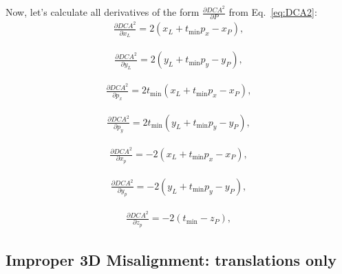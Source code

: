 \documentclass[a4paper,11pt]{article}
\begin{document}
Now, let's calculate all derivatives of the form $\frac{\partial DCA^2}{\partial P}$ from Eq.~\ref{eq:DCA2}:
\begin{equation}
\begin{split}
\frac{\partial DCA^2}{\partial x_L}  = 2 \left(x_L+t_{\min } p_x-x_P\right),
\end{split}
\end{equation}

\begin{equation}
\begin{split}
\frac{\partial DCA^2}{\partial y_L}  = 2 \left(y_L+t_{\min } p_y-y_P\right),
\end{split}
\end{equation}

\begin{equation}
\begin{split}
\frac{\partial DCA^2}{\partial p_x}  = 2 t_{\min } \left(x_L+t_{\min } p_x-x_P\right),
\end{split}
\end{equation}

\begin{equation}
\begin{split}
\frac{\partial DCA^2}{\partial p_y}  = 2 t_{\min } \left(y_L+t_{\min } p_y-y_P\right),
\end{split}
\end{equation}


\begin{equation}
\begin{split}
\frac{\partial DCA^2}{\partial x_p}  = -2 \left(x_L+t_{\min } p_x-x_P\right),
\end{split}
\end{equation}


\begin{equation}
\begin{split}
\frac{\partial DCA^2}{\partial y_p}  = -2 \left(y_L+t_{\min } p_y-y_P\right),
\end{split}
\end{equation}


\begin{equation}
\begin{split}
\frac{\partial DCA^2}{\partial z_p}  = -2 \left(t_{\min }-z_P\right),
\end{split}
\end{equation}


\subsection{Improper 3D Misalignment: translations only}
\end{document}
